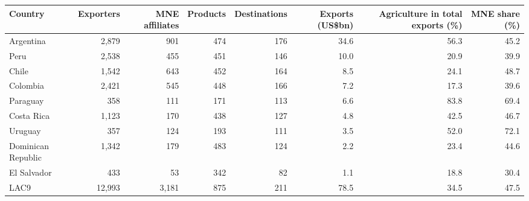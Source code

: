 \begin{tabular}{lrrrrrrr}
\toprule
Country & Exporters & MNE affiliates & Products & Destinations & Exports (US\$bn) & Agriculture in total exports (\%) & MNE share (\%) \\
\midrule
Argentina & 2,879 & 901 & 474 & 176 & 34.6 & 56.3 & 45.2 \\
Peru & 2,538 & 455 & 451 & 146 & 10.0 & 20.9 & 39.9 \\
Chile & 1,542 & 643 & 452 & 164 & 8.5 & 24.1 & 48.7 \\
Colombia & 2,421 & 545 & 448 & 166 & 7.2 & 17.3 & 39.6 \\
Paraguay & 358 & 111 & 171 & 113 & 6.6 & 83.8 & 69.4 \\
Costa Rica & 1,123 & 170 & 438 & 127 & 4.8 & 42.5 & 46.7 \\
Uruguay & 357 & 124 & 193 & 111 & 3.5 & 52.0 & 72.1 \\
Dominican Republic & 1,342 & 179 & 483 & 124 & 2.2 & 23.4 & 44.6 \\
El Salvador & 433 & 53 & 342 & 82 & 1.1 & 18.8 & 30.4 \\
\midrule
LAC9 & 12,993 & 3,181 & 875 & 211 & 78.5 & 34.5 & 47.5 \\
\bottomrule
\end{tabular}
